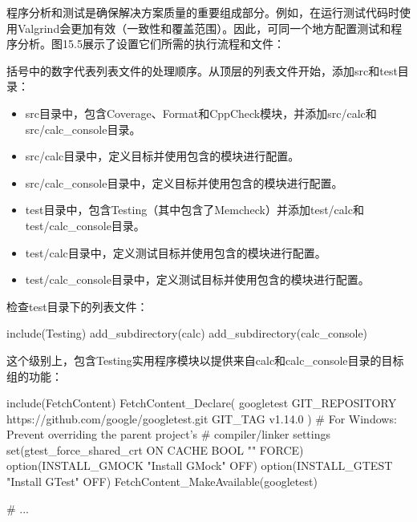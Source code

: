 
程序分析和测试是确保解决方案质量的重要组成部分。例如，在运行测试代码时使用Valgrind会更加有效（一致性和覆盖范围）。因此，可同一个地方配置测试和程序分析。图15.5展示了设置它们所需的执行流程和文件：


括号中的数字代表列表文件的处理顺序。从顶层的列表文件开始，添加src和test目录：

\begin{itemize}
\item
src目录中，包含Coverage、Format和CppCheck模块，并添加src/calc和src/calc\_console目录。

\item
src/calc目录中，定义目标并使用包含的模块进行配置。

\item
src/calc\_console目录中，定义目标并使用包含的模块进行配置。

\item
test目录中，包含Testing（其中包含了Memcheck）并添加test/calc和test/calc\_console目录。

\item
test/calc目录中，定义测试目标并使用包含的模块进行配置。

\item
test/calc\_console目录中，定义测试目标并使用包含的模块进行配置。
\end{itemize}

检查test目录下的列表文件：


\begin{cmake}
include(Testing)
add_subdirectory(calc)
add_subdirectory(calc_console)
\end{cmake}

这个级别上，包含Testing实用程序模块以提供来自calc和calc\_console目录的目标组的功能：


\begin{cmake}
include(FetchContent)
FetchContent_Declare(
    googletest
    GIT_REPOSITORY https://github.com/google/googletest.git
    GIT_TAG v1.14.0
)
# For Windows: Prevent overriding the parent project's
# compiler/linker settings
set(gtest_force_shared_crt ON CACHE BOOL "" FORCE)
option(INSTALL_GMOCK "Install GMock" OFF)
option(INSTALL_GTEST "Install GTest" OFF)
FetchContent_MakeAvailable(googletest)

# ...
\end{cmake}


